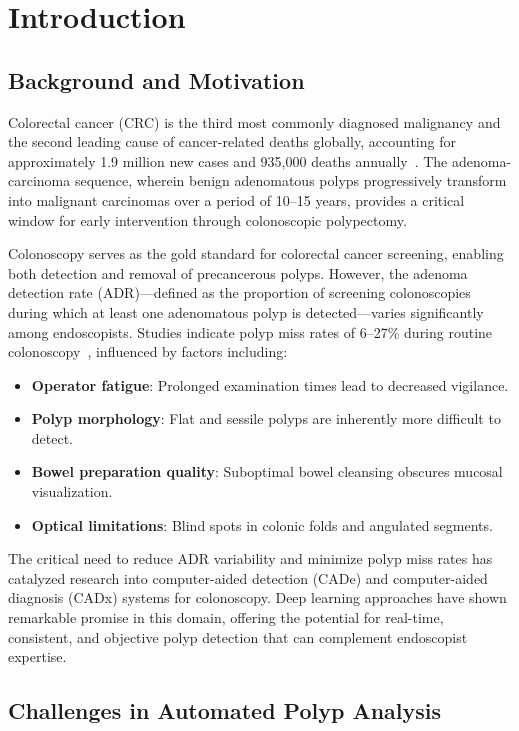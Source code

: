 \documentclass[conference]{IEEEtran}
\begin{document}
\section{Introduction}

\subsection{Background and Motivation}

Colorectal cancer (CRC) is the third most commonly diagnosed malignancy and the second leading cause of cancer-related deaths globally, accounting for approximately 1.9 million new cases and 935,000 deaths annually~\cite{siegel2023}. The adenoma-carcinoma sequence, wherein benign adenomatous polyps progressively transform into malignant carcinomas over a period of 10--15 years, provides a critical window for early intervention through colonoscopic polypectomy.

Colonoscopy serves as the gold standard for colorectal cancer screening, enabling both detection and removal of precancerous polyps. However, the adenoma detection rate (ADR)---defined as the proportion of screening colonoscopies during which at least one adenomatous polyp is detected---varies significantly among endoscopists. Studies indicate polyp miss rates of 6--27\% during routine colonoscopy~\cite{rex1997}, influenced by factors including:

\begin{itemize}
    \item \textbf{Operator fatigue}: Prolonged examination times lead to decreased vigilance.
    \item \textbf{Polyp morphology}: Flat and sessile polyps are inherently more difficult to detect.
    \item \textbf{Bowel preparation quality}: Suboptimal bowel cleansing obscures mucosal visualization.
    \item \textbf{Optical limitations}: Blind spots in colonic folds and angulated segments.
\end{itemize}

The critical need to reduce ADR variability and minimize polyp miss rates has catalyzed research into computer-aided detection (CADe) and computer-aided diagnosis (CADx) systems for colonoscopy. Deep learning approaches have shown remarkable promise in this domain, offering the potential for real-time, consistent, and objective polyp detection that can complement endoscopist expertise.

\subsection{Challenges in Automated Polyp Analysis}
\end{document}
